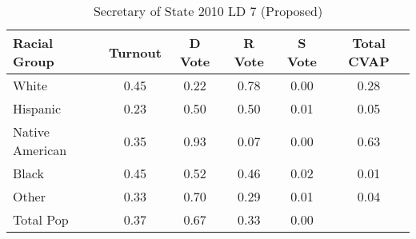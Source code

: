 \begin{table}[htb]
\begin{center}
\caption{Secretary of State 2010 LD 7 (Proposed)}
\label{sos10_cvap_ld_7}
\begin{tabular}{lccccc}
  \hline
Racial Group & Turnout & D Vote & R Vote & S Vote & Total CVAP \\ 
  \hline
White & 0.45 & 0.22 & 0.78 & 0.00 & 0.28 \\ 
  Hispanic & 0.23 & 0.50 & 0.50 & 0.01 & 0.05 \\ 
  Native American & 0.35 & 0.93 & 0.07 & 0.00 & 0.63 \\ 
  Black & 0.45 & 0.52 & 0.46 & 0.02 & 0.01 \\ 
  Other & 0.33 & 0.70 & 0.29 & 0.01 & 0.04 \\ 
  Total Pop & 0.37 & 0.67 & 0.33 & 0.00 &  \\ 
   \hline
\end{tabular}
\end{center}
\end{table}
